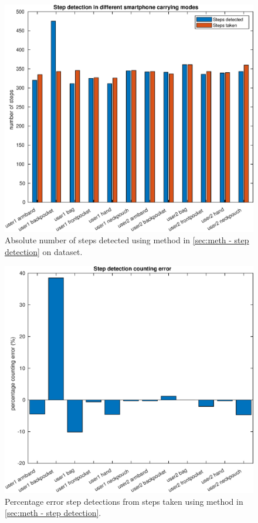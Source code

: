 	\begin{figure}[htbp]
		\centering
		\includegraphics[width=0.7\linewidth]{images/20201127_1516_Step_detection_in_different_smartphone_carrying_modes}
		
		\caption{Absolute number of steps detected using method in \cref{sec:meth - step detection} on \citet{Brajdic2013} dataset.}
		\label{fig:sd_abs_comparison}
	\end{figure}
	\begin{figure}[H]
		\centering
		\includegraphics[width=0.7\linewidth]{images/20201127_1520_Step_detection_counting_error}
		\setlength{\belowcaptionskip}{-10pt}
		\caption{Percentage error step detections from steps taken using method in \cref{sec:meth - step detection}. }
		\label{fig:sd_percent_comparison}
	\end{figure}

